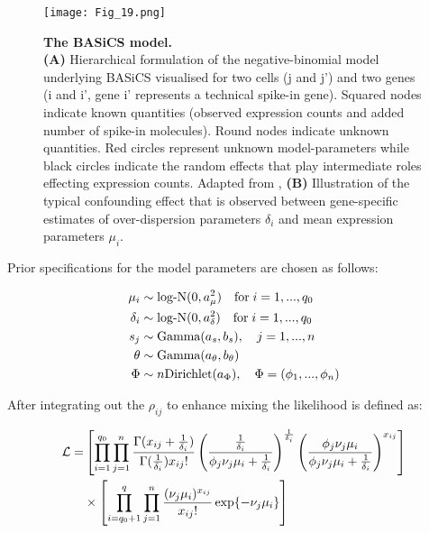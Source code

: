 \newpage

\begin{figure}[!h]
\centering
\texttt{[image: Fig\_19.png]}
\caption[The BASiCS model]{\textbf{The BASiCS model.}\\
\textbf{(A)} Hierarchical formulation of the negative-binomial model underlying BASiCS visualised for two cells (j and j') and two genes (i and i', gene i' represents a technical spike-in gene). Squared nodes indicate known quantities (observed expression counts and added number of spike-in molecules). Round nodes indicate unknown quantities. Red circles represent unknown model-parameters while black circles indicate the random effects that play intermediate roles effecting expression counts. Adapted from \citep{Vallejos2015BASiCS}, \textbf{(B)} Illustration of the typical confounding effect that is observed between gene-specific estimates of over-dispersion parameters $\delta_i$ and mean expression parameters $\mu_i$.}
\label{fig0:BASiCS}
\end{figure}

Prior specifications for the model parameters are chosen as follows:

\begin{align*}
\mu_i&\sim\textnormal{log-N}(0,a_\mu^2) \quad \textnormal{for}\;{}i=1,...,q_0\\
\delta_i&\sim\textnormal{log-N}(0,a_\delta^2) \quad \textnormal{for}\;{}i=1,...,q_0\\
s_j&\sim\textnormal{Gamma}(a_s,b_s), \quad j=1,...,n\\
\theta&\sim\textnormal{Gamma}(a_\theta,b_\theta)\\
\Phi&\sim{}n\textnormal{Dirichlet}(a_\Phi), \quad \Phi=(\phi_1,...,\phi_n)
\end{align*}

After integrating out the $\rho_{ij}$ to enhance mixing \citep{Vallejos2015BASiCS} the likelihood is defined as:

\begin{align} 
\mathcal{L} = & \left[\prod_{i=1}^{q_0}\prod_{j=1}^n\frac{\Gamma(x_{ij}+\frac{1}{\delta_i})}{\Gamma(\frac{1}{\delta_i})x_{ij}!}\left(\frac{\frac{1}{\delta_i}}{\phi_j\nu_j\mu_i+\frac{1}{\delta_i}}\right)^\frac{1}{\delta_i}\left(\frac{\phi_j\nu_j\mu_i}{\phi_j\nu_j\mu_i+\frac{1}{\delta_i}}\right)^{x_{ij}}\right] \nonumber\\ 
&\times\left[\prod_{i=q_0+1}^{q}\prod_{j=1}^n\frac{(\nu_j\mu_i)^{x_{ij}}}{x_{ij}!}\exp\lbrace-\nu_j\mu_i\rbrace\right]
\end{align} 

